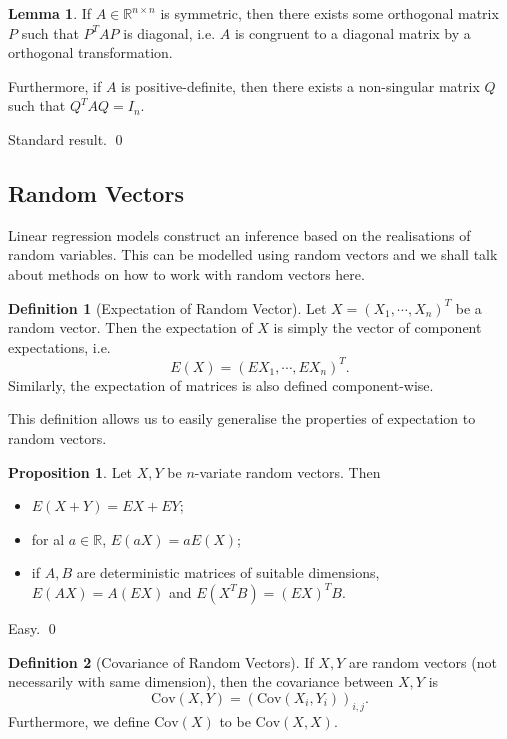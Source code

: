 \documentclass[
]{article}
\theoremstyle{definition}
\newtheorem{prop}{Proposition}
\theoremstyle{definition}
\newtheorem{definition}{Definition}[section]
\newtheorem{lemma}{Lemma}[section]
\begin{document}
\begin{lemma}
  If \(A \in \mathbb{R}^{n \times n}\) is symmetric, then there exists some orthogonal 
  matrix \(P\) such that \(P^T A P\) is diagonal, i.e. \(A\) is congruent to a 
  diagonal matrix by a orthogonal transformation.

  Furthermore, if \(A\) is positive-definite, then there exists a non-singular 
  matrix \(Q\) such that \(Q^T A Q = I_n\).
\end{lemma}
\proof

Standard result. \qed

\hypertarget{random-vectors}{%
\subsection{Random Vectors}\label{random-vectors}}

Linear regression models construct an inference based on the
realisations of random variables. This can be modelled using random
vectors and we shall talk about methods on how to work with random
vectors here.

\begin{definition}[Expectation of Random Vector]
  Let \(X = (X_1, \cdots, X_n)^T\) be a random vector. Then the expectation of 
  \(X\) is simply the vector of component expectations, i.e. 
  \[E(X) = (EX_1, \cdots, EX_n)^T.\] 
  Similarly, the expectation of matrices is also defined component-wise.
\end{definition}

This definition allows us to easily generalise the properties of
expectation to random vectors.

\begin{prop}
  Let \(X, Y\) be \(n\)-variate random vectors. Then 
  \begin{itemize}
    \item \(E(X + Y) = EX + EY\);
    \item for al \(a \in \mathbb{R}\), \(E(aX) = aE(X)\);
    \item if \(A, B\) are deterministic matrices of suitable dimensions, 
      \(E(AX) = A(EX)\) and \(E(X^T B) = (EX)^TB\).
  \end{itemize}
\end{prop}
\proof

Easy. \qed

\begin{definition}[Covariance of Random Vectors]
  If \(X, Y\) are random vectors (not necessarily with same dimension), then 
  the covariance between \(X, Y\) is 
  \[\text{Cov}(X, Y) = (\text{Cov}(X_i, Y_i))_{i, j}.\]
  Furthermore, we define \(\text{Cov}(X)\) to be \(\text{Cov}(X, X)\).
\end{definition}
\end{document}
